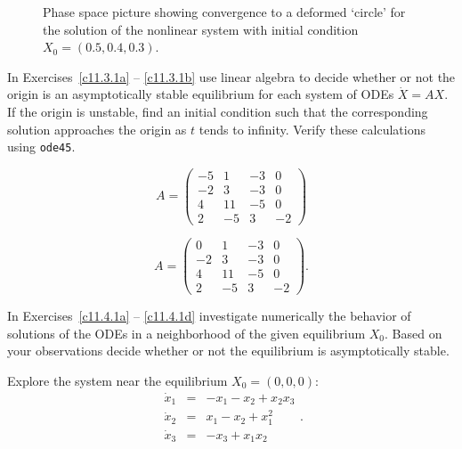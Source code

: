 \documentclass{ximera}
\begin{document}
\begin{figure}[htb]
   \centerline{%
   }
   \caption{Phase space picture showing convergence to a deformed `circle' 
	for the solution of the nonlinear system \protect{} with 
	initial condition $X_0=(0.5,0.4,0.3)$.}
   \label{F:3perps}
\end{figure}


\EXER

\CEXER

\noindent In Exercises~\ref{c11.3.1a} -- \ref{c11.3.1b} use linear algebra to 
decide whether or not the origin is an asymptotically stable equilibrium for 
each system of ODEs $\dot{X}=AX$. If the origin is unstable, find an initial 
condition such that the corresponding solution approaches the origin as $t$ 
tends to infinity.  Verify these calculations using {\tt ode45}.
\begin{exercise} \label{c11.3.1a}
\begin{equation*}
A =  \left(\begin{array}{rrrr}
    -5  &  1  & -3  &  0\\
    -2  &  3  & -3  &  0\\
     4  & 11  & -5  &  0\\
     2  & -5  &  3  & -2
\end{array}\right)
\end{equation*}
\end{exercise}
\begin{exercise} \label{c11.3.1b}
\begin{equation*}
A =  \left(\begin{array}{rrrr}
     0  &  1  & -3  &  0\\
    -2  &  3  & -3  &  0\\
     4  & 11  & -5  &  0\\
     2  & -5  &  3  & -2
\end{array}\right).
\end{equation*}
\end{exercise}

\noindent In Exercises~\ref{c11.4.1a} -- \ref{c11.4.1d} investigate
numerically the behavior of solutions of the ODEs in a neighborhood
of the given equilibrium $X_0$.  Based on your observations decide
whether or not the equilibrium is asymptotically stable.

\begin{exercise} \label{c11.4.1a}
Explore the system  near the equilibrium $X_0 = (0,0,0)$:
\begin{equation*}  \label{e11.4.1a}
\begin{array}{rcl}
\dot{x}_1 & = & -x_1 - x_2 + x_2 x_3\\
\dot{x}_2 & = & x_1 - x_2 +x_1^2\\
\dot{x}_3 & = & -x_3 + x_1 x_2
\end{array}.
\end{equation*}
\end{exercise}
\end{document}
